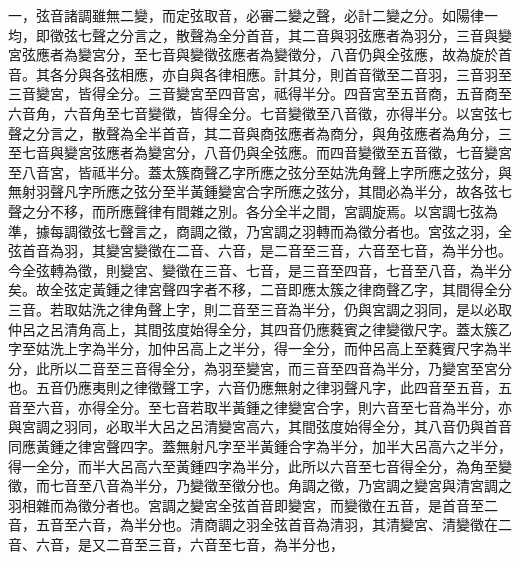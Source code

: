\begin{pinyinscope}
一，弦音諸調雖無二變，而定弦取音，必審二變之聲，必計二變之分。如陽律一均，即徵弦七聲之分言之，散聲為全分首音，其二音與羽弦應者為羽分，三音與變宮弦應者為變宮分，至七音與變徵弦應者為變徵分，八音仍與全弦應，故為旋於首音。其各分與各弦相應，亦自與各律相應。計其分，則首音徵至二音羽，三音羽至三音變宮，皆得全分。三音變宮至四音宮，祗得半分。四音宮至五音商，五音商至六音角，六音角至七音變徵，皆得全分。七音變徵至八音徵，亦得半分。以宮弦七聲之分言之，散聲為全半首音，其二音與商弦應者為商分，與角弦應者為角分，三至七音與變宮弦應者為變宮分，八音仍與全弦應。而四音變徵至五音徵，七音變宮至八音宮，皆祗半分。蓋太簇商聲乙字所應之弦分至姑洗角聲上字所應之弦分，與無射羽聲凡字所應之弦分至半黃鍾變宮合字所應之弦分，其間必為半分，故各弦七聲之分不移，而所應聲律有間雜之別。各分全半之間，宮調旋焉。以宮調七弦為準，據每調徵弦七聲言之，商調之徵，乃宮調之羽轉而為徵分者也。宮弦之羽，全弦首音為羽，其變宮變徵在二音、六音，是二音至三音，六音至七音，為半分也。今全弦轉為徵，則變宮、變徵在三音、七音，是三音至四音，七音至八音，為半分矣。故全弦定黃鍾之律宮聲四字者不移，二音即應太簇之律商聲乙字，其間得全分三音。若取姑洗之律角聲上字，則二音至三音為半分，仍與宮調之羽同，是以必取仲呂之呂清角高上，其間弦度始得全分，其四音仍應蕤賓之律變徵尺字。蓋太簇乙字至姑洗上字為半分，加仲呂高上之半分，得一全分，而仲呂高上至蕤賓尺字為半分，此所以二音至三音得全分，為羽至變宮，而三音至四音為半分，乃變宮至宮分也。五音仍應夷則之律徵聲工字，六音仍應無射之律羽聲凡字，此四音至五音，五音至六音，亦得全分。至七音若取半黃鍾之律變宮合字，則六音至七音為半分，亦與宮調之羽同，必取半大呂之呂清變宮高六，其間弦度始得全分，其八音仍與首音同應黃鍾之律宮聲四字。蓋無射凡字至半黃鍾合字為半分，加半大呂高六之半分，得一全分，而半大呂高六至黃鍾四字為半分，此所以六音至七音得全分，為角至變徵，而七音至八音為半分，乃變徵至徵分也。角調之徵，乃宮調之變宮與清宮調之羽相雜而為徵分者也。宮調之變宮全弦首音即變宮，而變徵在五音，是首音至二音，五音至六音，為半分也。清商調之羽全弦首音為清羽，其清變宮、清變徵在二音、六音，是又二音至三音，六音至七音，為半分也，
\end{pinyinscope}
